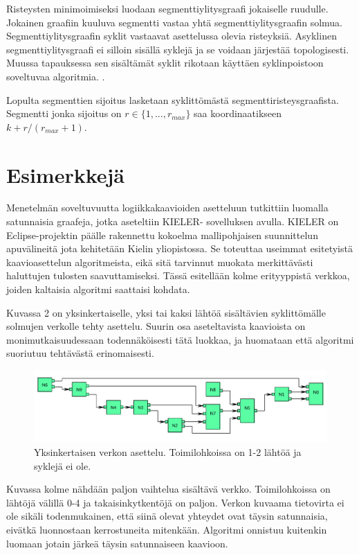 \documentclass[finnish,12pt]{article}
\begin{document}
Risteysten minimoimiseksi luodaan segmenttiylitysgraafi jokaiselle ruudulle.
Jokainen graafiin kuuluva segmentti vastaa yhtä segmenttiylitysgraafin solmua.
Segmenttiylitysgraafin syklit vastaavat asettelussa olevia risteyksiä.
Asyklinen segmenttiylitysgraafi ei silloin sisällä syklejä ja se voidaan järjestää topologisesti.
Muussa tapauksessa sen sisältämät syklit rikotaan käyttäen syklinpoistoon soveltuvaa algoritmia. \cite{RefWorks:48}.

Lopulta segmenttien sijoitus lasketaan syklittömästä segmenttiristeysgraafista.
Segmentti jonka sijoitus on $r \in \{1,...,r_{max}\}$ saa koordinaatikseen $k + r/(r_{max} +1)$.

	\clearpage
	\section{Esimerkkejä}
	
Menetelmän soveltuvuutta logiikkakaavioiden asetteluun tutkittiin luomalla satunnaisia graafeja, jotka aseteltiin KIELER- sovelluksen avulla.
KIELER on Eclipse-projektin päälle rakennettu kokoelma mallipohjaisen suunnittelun apuvälineitä jota kehitetään Kielin yliopistossa. \cite{RefWorks:123}
Se toteuttaa useimmat esitetyistä kaavioasettelun algoritmeista, eikä sitä tarvinnut muokata merkittävästi haluttujen tulosten saavuttamiseksi.
Tässä esitellään kolme erityyppistä verkkoa, joiden kaltaisia algoritmi saattaisi kohdata.

Kuvassa 2 on yksinkertaiselle, yksi tai kaksi lähtöä sisältävien syklittömälle solmujen verkolle tehty asettelu.
Suurin osa aseteltavista kaavioista on monimutkaisuudessaan todennäköisesti tätä luokkaa, ja huomataan että algoritmi suoriutuu tehtävästä erinomaisesti.

\begin{figure}[ht]
	\includegraphics[width=\textwidth]{esim1.pdf}
	\caption{Yksinkertaisen verkon asettelu. Toimilohkoissa on 1-2 lähtöä ja syklejä ei ole.}
\end{figure}

Kuvassa kolme nähdään paljon vaihtelua sisältävä verkko.
Toimilohkoissa on lähtöjä välillä 0-4 ja takaisinkytkentöjä on paljon.
Verkon kuvaama tietovirta ei ole sikäli todenmukainen, että siinä olevat yhteydet ovat täysin satunnaisia, eivätkä luonnostaan kerrostuneita mitenkään.
Algoritmi onnistuu kuitenkin luomaan jotain järkeä täysin satunnaiseen kaavioon.
\end{document}
